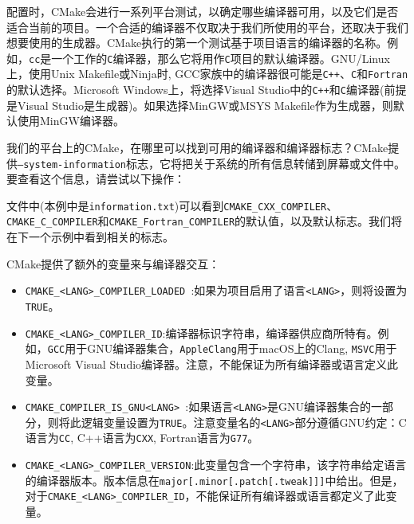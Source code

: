 
配置时，CMake会进行一系列平台测试，以确定哪些编译器可用，以及它们是否适合当前的项目。一个合适的编译器不仅取决于我们所使用的平台，还取决于我们想要使用的生成器。CMake执行的第一个测试基于项目语言的编译器的名称。例如，\texttt{cc}是一个工作的\texttt{C}编译器，那么它将用作\texttt{C}项目的默认编译器。GNU/Linux上，使用Unix Makefile或Ninja时, GCC家族中的编译器很可能是\texttt{C++}、\texttt{C}和\texttt{Fortran}的默认选择。Microsoft Windows上，将选择Visual Studio中的\texttt{C++}和\texttt{C}编译器(前提是Visual Studio是生成器)。如果选择MinGW或MSYS Makefile作为生成器，则默认使用MinGW编译器。


我们的平台上的CMake，在哪里可以找到可用的编译器和编译器标志？CMake提供\texttt{--system-information}标志，它将把关于系统的所有信息转储到屏幕或文件中。要查看这个信息，请尝试以下操作：


文件中(本例中是\texttt{information.txt})可以看到\texttt{CMAKE\_CXX\_COMPILER}、\texttt{CMAKE\_C\_COMPILER}和\texttt{CMAKE\_Fortran\_COMPILER}的默认值，以及默认标志。我们将在下一个示例中看到相关的标志。

CMake提供了额外的变量来与编译器交互：

\begin{itemize}
\item \texttt{CMAKE\_<LANG>\_COMPILER\_LOADED }:如果为项目启用了语言\texttt{<LANG>}，则将设置为\texttt{TRUE}。

\item \texttt{CMAKE\_<LANG>\_COMPILER\_ID}:编译器标识字符串，编译器供应商所特有。例如，\texttt{GCC}用于GNU编译器集合，\texttt{AppleClang}用于macOS上的Clang, \texttt{MSVC}用于Microsoft Visual Studio编译器。注意，不能保证为所有编译器或语言定义此变量。

\item \texttt{CMAKE\_COMPILER\_IS\_GNU<LANG> }:如果语言\texttt{<LANG>}是GNU编译器集合的一部分，则将此逻辑变量设置为\texttt{TRUE}。注意变量名的\texttt{<LANG>}部分遵循GNU约定：C语言为\texttt{CC}, C++语言为\texttt{CXX}, Fortran语言为\texttt{G77}。

\item \texttt{CMAKE\_<LANG>\_COMPILER\_VERSION}:此变量包含一个字符串，该字符串给定语言的编译器版本。版本信息在\texttt{major[.minor[.patch[.tweak]]]}中给出。但是，对于\texttt{CMAKE\_<LANG>\_COMPILER\_ID}，不能保证所有编译器或语言都定义了此变量。

\end{itemize}

